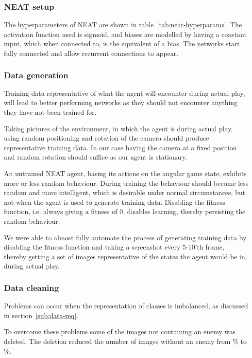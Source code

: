 \subsubsection{NEAT setup}
The hyperparameters of NEAT are shown in table~\ref{tab:neat-hyperparams}. The activation function used is sigmoid, and biases are modelled by having a constant input, which when connected to, is the equivalent of a bias. The networks start fully connected and allow recurrent connections to appear.


\subsubsection{Data generation}
\label{subsub:data-gen}
Training data representative of what the agent will encounter during actual play, will lead to better performing networks as they should not encounter anything they have not been trained for.

Taking pictures of the environment, in which the agent is during actual play, using random positioning and rotation of the camera should produce representative training data. In our case having the camera at a fixed position and random rotation should suffice as our agent is stationary.

An untrained NEAT agent, basing its actions on the angular game state, exhibits more or less random behaviour. During training the behaviour should become less random and more intelligent, which is desirable under normal circumstances, but not when the agent is used to generate training data. Disabling the fitness function, i.e. always giving a fitness of 0, disables learning, thereby persisting the random behaviour.

We were able to almost fully automate the process of generating training data by disabling the fitness function and taking a screenshot every 5-10'th frame,  thereby getting a set of images representative of the states the agent would be in, during actual play.


\subsubsection{Data cleaning}
Problems can occur when the representation of classes is imbalanced, as discussed in section~\ref{sub:data-req}.

To overcome these problems some of the images not containing an enemy was deleted. The deletion reduced the number of images without an enemy from \% to \%.


